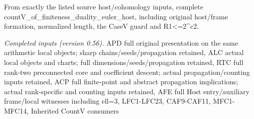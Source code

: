 From exactly the listed source host/cohomology inputs, complete countV\_\allowbreak of\_\allowbreak finiteness\_\allowbreak duality\_\allowbreak euler\_\allowbreak host, including original host/frame formation, normalized length, the CaseV guard and R1<=2\textasciicircum{}c2.

\emph{Completed inputs (version 0.56).} APD full original presentation on the same arithmetic local objects; sharp chains/seeds/propagation retained, ALC actual local objects and charts; full dimensions/seeds/propagation retained, RTC full rank-two preconnected core and coefficient descent; actual propagation/counting inputs retained, ACP full finite-point and abstract propagation implications; actual rank-specific and counting inputs retained, AFE full Host entry/auxiliary frame/local witnesses including ell=3, LFC1-LFC23, CAF9-CAF11, MFC1-MFC14, Inherited CountV consumers


